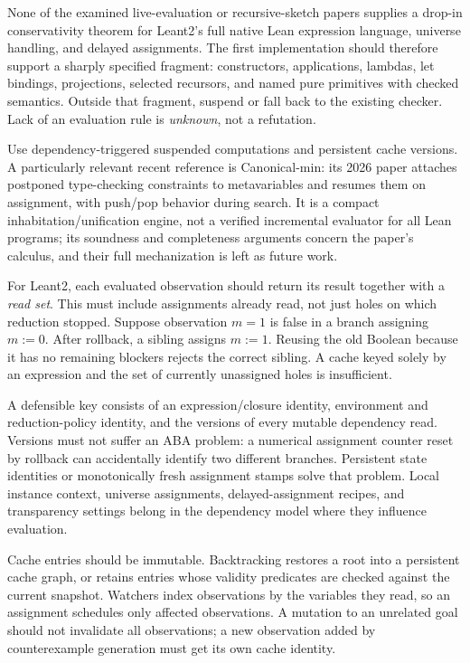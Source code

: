 None of the examined live-evaluation or recursive-sketch papers supplies a drop-in conservativity theorem for Leant2's full native Lean expression language, universe handling, and delayed assignments. The first implementation should therefore support a sharply specified fragment: constructors, applications, lambdas, let bindings, projections, selected recursors, and named pure primitives with checked semantics. Outside that fragment, suspend or fall back to the existing checker. Lack of an evaluation rule is \emph{unknown}, not a refutation.


\answer Use dependency-triggered suspended computations and persistent cache versions. A particularly relevant recent reference is Canonical-min: its 2026 paper attaches postponed type-checking constraints to metavariables and resumes them on assignment, with push/pop behavior during search. It is a compact inhabitation/unification engine, not a verified incremental evaluator for all Lean programs; its soundness and completeness arguments concern the paper's calculus, and their full mechanization is left as future work.\cite{canonicalmin}

For Leant2, each evaluated observation should return its result together with a \emph{read set}. This must include assignments already read, not just holes on which reduction stopped. Suppose observation $m=1$ is false in a branch assigning $m:=0$. After rollback, a sibling assigns $m:=1$. Reusing the old Boolean because it has no remaining blockers rejects the correct sibling. A cache keyed solely by an expression and the set of currently unassigned holes is insufficient.

A defensible key consists of an expression/closure identity, environment and reduction-policy identity, and the versions of every mutable dependency read. Versions must not suffer an ABA problem: a numerical assignment counter reset by rollback can accidentally identify two different branches. Persistent state identities or monotonically fresh assignment stamps solve that problem. Local instance context, universe assignments, delayed-assignment recipes, and transparency settings belong in the dependency model where they influence evaluation.

Cache entries should be immutable. Backtracking restores a root into a persistent cache graph, or retains entries whose validity predicates are checked against the current snapshot. Watchers index observations by the variables they read, so an assignment schedules only affected observations. A mutation to an unrelated goal should not invalidate all observations; a new observation added by counterexample generation must get its own cache identity.

